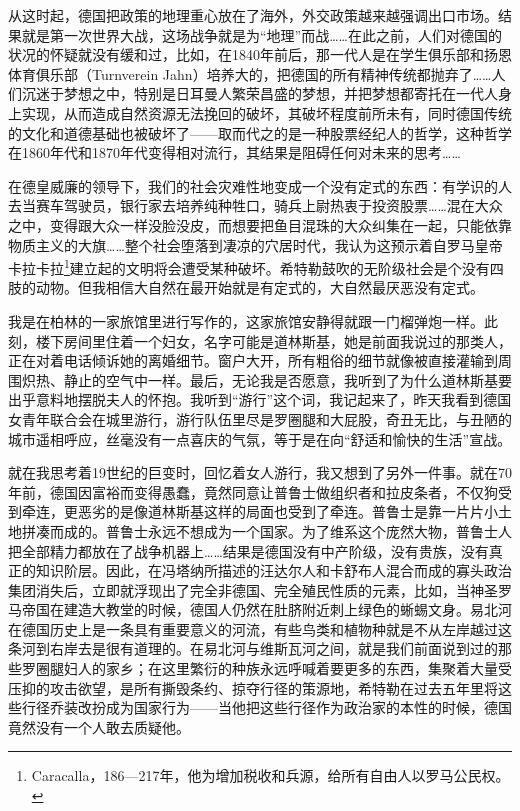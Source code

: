 \documentclass[UTF8]{ctexart}
\begin{document}
从这时起，德国把政策的地理重心放在了海外，外交政策越来越强调出口市场。结果就是第一次世界大战，这场战争就是为“地理”而战……在此之前，人们对德国的状况的怀疑就没有缓和过，比如，在1840年前后，那一代人是在学生俱乐部和扬恩体育俱乐部（Turnverein Jahn）培养大的，把德国的所有精神传统都抛弃了……人们沉迷于梦想之中，特别是日耳曼人繁荣昌盛的梦想，并把梦想都寄托在一代人身上实现，从而造成自然资源无法挽回的破坏，其破坏程度前所未有，同时德国传统的文化和道德基础也被破坏了——取而代之的是一种股票经纪人的哲学，这种哲学在1860年代和1870年代变得相对流行，其结果是阻碍任何对未来的思考……

在德皇威廉的领导下，我们的社会灾难性地变成一个没有定式的东西：有学识的人去当赛车驾驶员，银行家去培养纯种牲口，骑兵上尉热衷于投资股票……混在大众之中，变得跟大众一样没脸没皮，而想要把鱼目混珠的大众纠集在一起，只能依靠物质主义的大旗……整个社会堕落到凄凉的穴居时代，我认为这预示着自罗马皇帝卡拉卡拉\footnote{Caracalla，186—217年，他为增加税收和兵源，给所有自由人以罗马公民权。}建立起的文明将会遭受某种破坏。希特勒鼓吹的无阶级社会是个没有四肢的动物。但我相信大自然在最开始就是有定式的，大自然最厌恶没有定式。

我是在柏林的一家旅馆里进行写作的，这家旅馆安静得就跟一门榴弹炮一样。此刻，楼下房间里住着一个妇女，名字可能是道林斯基，她是前面我说过的那类人，正在对着电话倾诉她的离婚细节。窗户大开，所有粗俗的细节就像被直接灌输到周围炽热、静止的空气中一样。最后，无论我是否愿意，我听到了为什么道林斯基要出乎意料地摆脱夫人的怀抱。我听到“游行”这个词，我记起来了，昨天我看到德国女青年联合会在城里游行，游行队伍里尽是罗圈腿和大屁股，奇丑无比，与丑陋的城市遥相呼应，丝毫没有一点喜庆的气氛，等于是在向“舒适和愉快的生活”宣战。

就在我思考着19世纪的巨变时，回忆着女人游行，我又想到了另外一件事。就在70年前，德国因富裕而变得愚蠢，竟然同意让普鲁士做组织者和拉皮条者，不仅狗受到牵连，更恶劣的是像道林斯基这样的局面也受到了牵连。普鲁士是靠一片片小土地拼凑而成的。普鲁士永远不想成为一个国家。为了维系这个庞然大物，普鲁士人把全部精力都放在了战争机器上……结果是德国没有中产阶级，没有贵族，没有真正的知识阶层。因此，在冯塔纳所描述的汪达尔人和卡舒布人混合而成的寡头政治集团消失后，立即就浮现出了完全非德国、完全殖民性质的元素，比如，当神圣罗马帝国在建造大教堂的时候，德国人仍然在肚脐附近刺上绿色的蜥蜴文身。易北河在德国历史上是一条具有重要意义的河流，有些鸟类和植物种就是不从左岸越过这条河到右岸去是很有道理的。在易北河与维斯瓦河之间，就是我们前面说到过的那些罗圈腿妇人的家乡；在这里繁衍的种族永远呼喊着要更多的东西，集聚着大量受压抑的攻击欲望，是所有撕毁条约、掠夺行径的策源地，希特勒在过去五年里将这些行径乔装改扮成为国家行为——当他把这些行径作为政治家的本性的时候，德国竟然没有一个人敢去质疑他。
\end{document}

